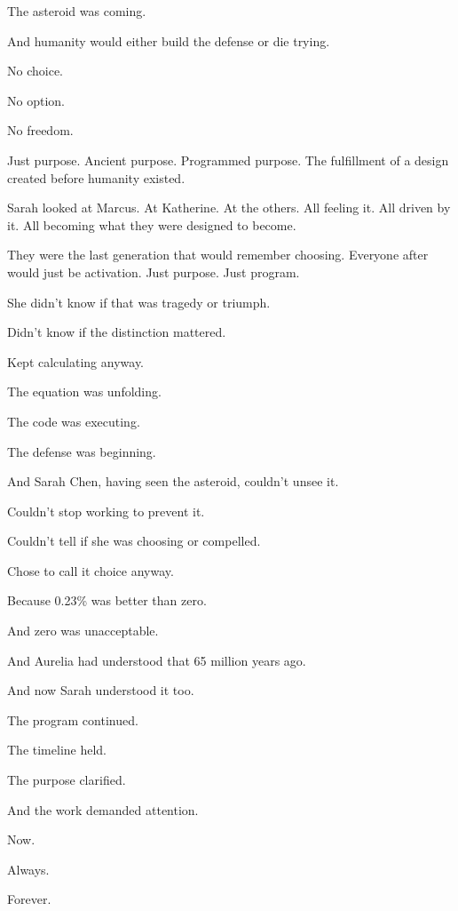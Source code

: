 The asteroid was coming.

And humanity would either build the defense or die trying.

No choice.

No option.

No freedom.

Just purpose. Ancient purpose. Programmed purpose. The fulfillment of a design created before humanity existed.

Sarah looked at Marcus. At Katherine. At the others. All feeling it. All driven by it. All becoming what they were designed to become.

They were the last generation that would remember choosing. Everyone after would just be activation. Just purpose. Just program.

She didn't know if that was tragedy or triumph.

Didn't know if the distinction mattered.

Kept calculating anyway.

The equation was unfolding.

The code was executing.

The defense was beginning.

And Sarah Chen, having seen the asteroid, couldn't unsee it.

Couldn't stop working to prevent it.

Couldn't tell if she was choosing or compelled.

Chose to call it choice anyway.

Because 0.23\% was better than zero.

And zero was unacceptable.

And Aurelia had understood that 65 million years ago.

And now Sarah understood it too.

The program continued.

The timeline held.

The purpose clarified.

And the work demanded attention.

Now.

Always.

Forever.

